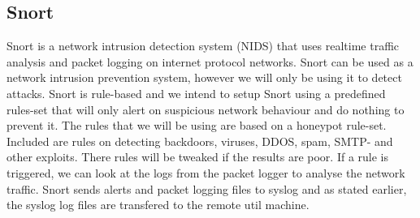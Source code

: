 \documentclass[11pt]{article} %
\begin{document}
\subsection{Snort}
Snort is a network intrusion detection system (NIDS) that uses realtime traffic analysis and packet logging on internet protocol networks.
Snort can be used as a network intrusion prevention system, however we will only be using it to detect attacks.
Snort is rule-based and we intend to setup Snort using a predefined rules-set that will only alert on suspicious network behaviour and do nothing to prevent it. 
The rules that we will be using are based on a honeypot rule-set. Included are rules on detecting backdoors, viruses, DDOS, spam, SMTP- and other exploits. There rules will be tweaked if the results are poor.
If a rule is triggered, we can look at the logs from the packet logger to analyse the network traffic.
Snort sends alerts and packet logging files to syslog and as stated earlier, the syslog log files are transfered to the remote util machine.





\end{document}
